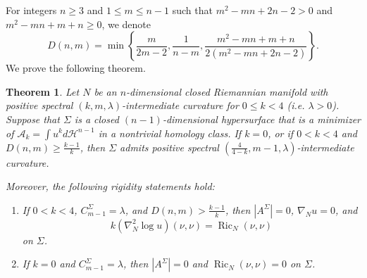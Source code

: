 \documentclass[11pt]{amsart}
\DeclareMathOperator{\Ric}{Ric}
\newcommand{\mA}{\mathcal{A}}
\newtheorem{theorem}{Theorem}[section]
\theoremstyle{definition}
\theoremstyle{remark}
\numberwithin{equation}{section}
\begin{document}
For integers $n\geq 3 $ and $1\leq m\leq n-1$ such that $m^2-mn+2n-2>0$ and $m^2-mn+m+n\geq0$, we
  denote 
\[D(n,m)=\min\left\{\frac{m}{2m-2},\frac{1}{n-m},\frac{m^2-mn+m+n}{2(m^2-mn+2n-2)}\right\}.\]
We prove the following theorem.

\begin{theorem}\label{spectral inheritance}
    Let $N$ be an $n$-dimensional closed Riemannian manifold with positive spectral
      $(k,m,\lambda)$-intermediate curvature for $0\leq k<4$ \textnormal{(i.e. $\lambda>0$)}. Suppose that $\Sigma$ is
      a closed $(n-1)$-dimensional hypersurface that is a minimizer of $\mA_{k}=\int
      u^k d\mathcal{H}^{n-1}$ in a nontrivial homology class. If $k=0$, or if
      $0<k<4$ and $D(n,m)\geq \frac{k-1}{k}$, then $\Sigma$ admits positive spectral
      $(\frac{4}{4-k},m-1,\lambda)$-intermediate curvature.
     

    Moreover, the following rigidity statements hold:
    \begin{enumerate}[label=(\alph*)]
        \item If $0<k<4$, $C_{m-1}^{\Sigma}=\lambda$, and
          $D(n,m)> \frac{k-1}{k}$, then $|A^{\Sigma}|=0$,
          $\nabla_Nu=0$, and
          \[
              k(\nabla_N^2\log u)(\nu,\nu)=\Ric_N(\nu,\nu)
          \]
          on $\Sigma$.
        \item If $k=0$ and $C_{m-1}^{\Sigma}=\lambda$, then $|A^{\Sigma}|=0$ and
          $\Ric_N(\nu,\nu)=0$ on $\Sigma$.
    \end{enumerate}
\end{theorem}
\end{document}
